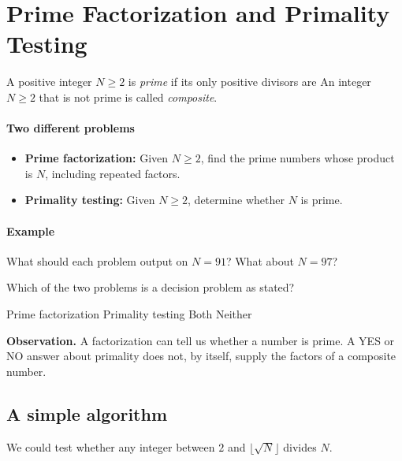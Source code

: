 \documentclass[11  pt]{article}
\begin{document}

\section{Prime Factorization and Primality Testing}
A positive integer $N\geq 2$ is \emph{prime} if its only positive divisors are  An integer $N\geq 2$ that is not prime is called \emph{composite}.

\paragraph{Two different problems}
\begin{itemize}
    \item \textbf{Prime factorization:} Given $N\geq 2$, find the prime numbers whose product is $N$, including repeated factors.
    \vs{.5cm}
    \item \textbf{Primality testing:} Given $N\geq 2$, determine whether $N$ is prime.
\end{itemize}

\paragraph{Example}
What should each problem output on $N=91$? What about $N=97$?
\vs{2cm}

\begin{Qu}
    Which of the two problems is a decision problem as stated?
    \begin{itemize}
        \aitem Prime factorization
        \bitem Primality testing
        \citem Both
        \ditem Neither
    \end{itemize}
\end{Qu}

\vfill
\textbf{Observation.} A factorization can tell us whether a number is prime. A YES or NO answer about primality does not, by itself, supply the factors of a composite number.

\newpage
\subsection*{A simple algorithm}
We could test whether any integer between $2$ and $\lfloor\sqrt N\rfloor$ divides $N$.
\end{document}
